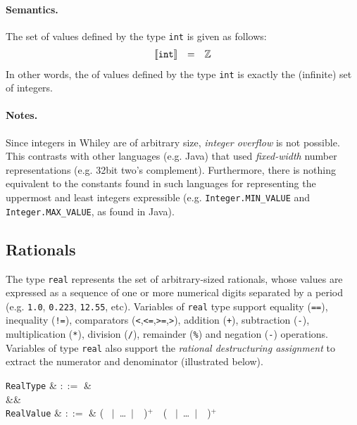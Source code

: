 \paragraph{Semantics.}  The set of values defined by the type \lstinline{int} is given as follows:
\begin{displaymath}
\begin{array}{rcl}
\llbracket{\tt int}\rrbracket & = & \mathbb{Z}\\
\end{array}
\end{displaymath}
In other words, the of values defined by the type \lstinline{int} is exactly the (infinite) set of integers.

\paragraph{Notes.}  Since integers in Whiley are of arbitrary size, {\em integer overflow} is not possible.  This contrasts with other languages (e.g. Java) that used {\em fixed-width} number representations (e.g. 32bit two's complement).  Furthermore, there is nothing equivalent to the constants found in such languages for representing the uppermost and least integers expressible (e.g. \lstinline{Integer.MIN_VALUE} and \lstinline{Integer.MAX_VALUE}, as found in Java).

\subsection{Rationals}

The type \lstinline{real} represents the set of arbitrary-sized rationals, whose values are expressed as a sequence of one or more numerical digits separated by a period (e.g. \lstinline{1.0}, \lstinline{0.223}, \lstinline{12.55}, etc).  Variables of \lstinline{real} type support equality (\lstinline{==}), inequality (\lstinline{!=}), comparators (\lstinline{<},\lstinline{<=},\lstinline{>=},\lstinline{>}), addition (\lstinline{+}), subtraction (\lstinline{-}), multiplication (\lstinline{*}), division (\lstinline{/}), remainder (\lstinline{%}) and negation (\lstinline{-}) operations.  Variables of type \lstinline{real} also support the {\em rational destructuring assignment} to extract the numerator and denominator (illustrated below).

\begin{syntax}
  \verb+RealType+ & $::=$ &  \\
  &&\\
  \verb+RealValue+ & $::=$ & \big( \ $|$\ \ldots\ $|$\ \ \big)$^+$\ \ \big( \ $|$\ \ldots\ $|$\ \ \big)$^+$ \\
\end{syntax}

